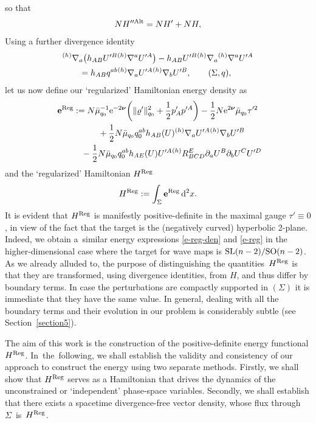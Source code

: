 \documentclass[pdftex]{sigma}
\def\ptl{\partial}%
\def\mbo#1{\boldsymbol{#1}}%
\def\grad{{\nabla}}%
\newcommand{\leftexp}[2]{{\vphantom{#2}}^{#1}{#2}}
\def\halb{\frac{1}{2}}%
\numberwithin{equation}{section}
\begin{document}
so that
\begin{align}
NH''^{{\rm Alt}} = NH' + NH,
\end{align}
\fi
Using a further divergence identity
\begin{align*}
& \leftexp{(h)}{\grad}_a \bigl(h_{AB} U'^B \leftexp{(h)}{\grad} ^a U'^A\bigr) - h_{AB} U'^B \leftexp{(h)}{\grad}_a \leftexp{(h)}{\grad}^a U'^A \notag\\
&\qquad{}= h_{AB} q^{ab} \leftexp{(h)}{\grad}_a U'^A \leftexp{(h)}{\grad}_b U'^B, \qquad (\Sigma, q),
\end{align*}
let us now define our `regularized' Hamiltonian energy density as
\begin{gather}
\mathbf{e}^{{\rm Reg}} := N \bar{\mu}^{-1}_{q_0} {\rm e}^{-2 \mbo{\nu}} \biggl(\Vert \varrho' \Vert^2_{q_0} + \halb p'_A p'^A \biggr) - \halb N {\rm e}^{2 \mbo{\nu}} \bar{\mu}_{q_0} \tau'^2 \notag\\ \hphantom{\mathbf{e}^{{\rm Reg}} :=}{}
+ \halb N \bar{\mu}_{q_0} q_0^{ab} h_{AB}(U) \leftexp{(h)}{\grad}_a U'^A \leftexp{(h)}{\grad}_b U'^B \notag\\ \hphantom{\mathbf{e}^{{\rm Reg}} :=}{}
- \halb N \bar{\mu}_{q_0} q^{ab}_0 h_{AE} (U) U'^A \leftexp{(h)}R^E _{BCD} \ptl_a U^B \ptl_b U^C U'^D \label{e-reg-den}
\end{gather}
and the `regularized' Hamiltonian $H^{{\rm Reg}}$
\begin{align} \label{e-reg}
H^{{\rm Reg}} := \int_{\Sigma} \mathbf{e}^{{\rm Reg}} \, {\rm d}^2 x.
\end{align}
It is evident that $H^{{\rm Reg}}$ is manifestly positive-definite in the maximal gauge $\tau' \equiv 0$, in view of the fact that the target is the (negatively curved) hyperbolic 2-plane. Indeed, we obtain a~similar energy expressions \eqref{e-reg-den} and \eqref{e-reg} in the higher-dimensional case where the target for wave maps is ${\rm SL}(n-2)/{\rm SO}(n-2)$.
As we already alluded to, the purpose of distinguishing the quantities~$H^{{\rm Reg}}$ is that they are transformed, using divergence identities, from $H$, and thus differ by boundary terms. In case the perturbations are compactly supported in $(\Sigma)$ it is immediate that they have the same value. In general, dealing with all the boundary terms and their evolution in our problem is considerably subtle (see Section~\ref{section5}).

 The aim of this work is the construction of the positive-definite energy functional $H^{{\rm Reg}}$. In~the~following, we shall establish the validity and consistency of our approach to construct the energy using two separate methods. Firstly, we shall show that $H^{{\rm Reg}}$ serves as a Hamiltonian that drives the dynamics of the unconstrained or `independent' phase-space variables. Secondly, we shall establish that there exists a spacetime divergence-free vector density, whose flux through~$\Sigma$~is~$H^{{\rm Reg}}$.
\end{document}
